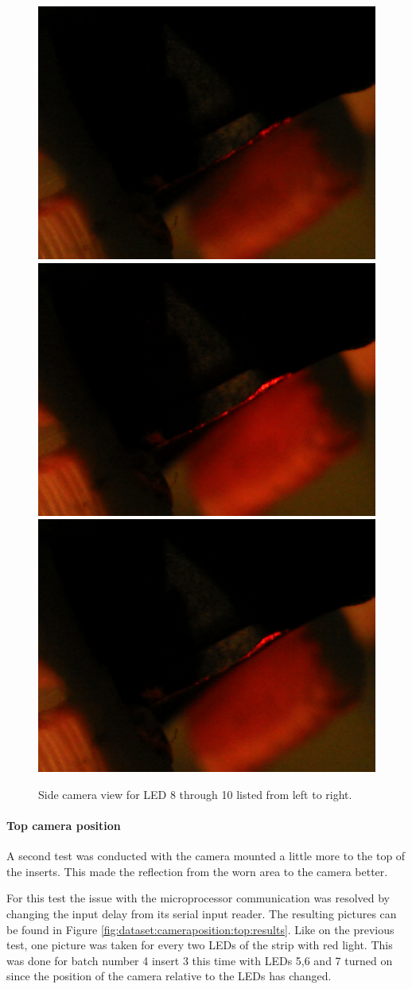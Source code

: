 		\begin{figure}
			\includegraphics[width=.3\textwidth, keepaspectratio=true]{./fig/Vision/Dataset/automated_datasets/1_check_camera_position/1_camera_position_side/p3_l8.png}\hfill
			\includegraphics[width=.3\textwidth, keepaspectratio=true]{./fig/Vision/Dataset/automated_datasets/1_check_camera_position/1_camera_position_side/p3_l9.png}\hfill
			\includegraphics[width=.3\textwidth, keepaspectratio=true]{./fig/Vision/Dataset/automated_datasets/1_check_camera_position/1_camera_position_side/p3_l10.png}
			\caption{Side camera view for LED 8 through 10 listed from left to right.}
			\label{fig:dataset:cameraposition:side:results}
		\end{figure}

		\paragraph{Top camera position}

A second test was conducted with the camera mounted a little more to the top of the inserts. This made the reflection from the worn area to the camera better. 

For this test the issue with the microprocessor communication was resolved by changing the input delay from its serial input reader. The resulting pictures can be found in Figure \ref{fig:dataset:cameraposition:top:results}.
Like on the previous test, one picture was taken for every two LEDs of the strip with red light. This was done for batch number 4 insert 3 this time with LEDs 5,6 and 7 turned on since the position of the camera relative to the LEDs has changed.

